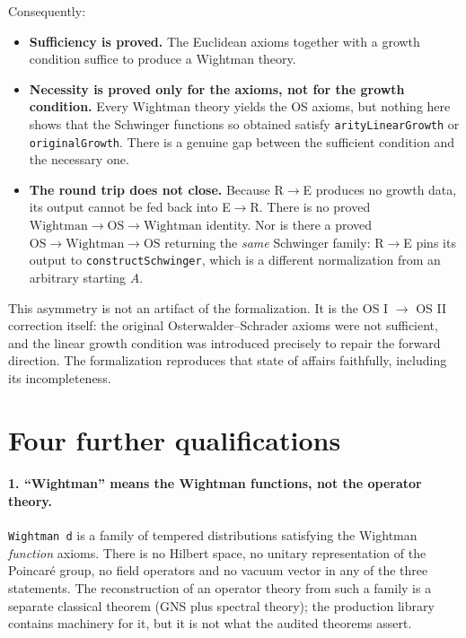 \documentclass[11pt,a4paper]{article}
\newcommand{\lean}[1]{\texttt{#1}}
\begin{document}
Consequently:

\begin{itemize}[leftmargin=1.6em,itemsep=4pt]
\item \textbf{Sufficiency is proved.} The Euclidean axioms together with a growth
condition suffice to produce a Wightman theory.
\item \textbf{Necessity is proved only for the axioms, not for the growth
condition.} Every Wightman theory yields the OS axioms, but nothing here shows
that the Schwinger functions so obtained satisfy \lean{arityLinearGrowth} or
\lean{originalGrowth}. There is a genuine gap between the sufficient condition
and the necessary one.
\item \textbf{The round trip does not close.} Because R$\to$E produces no growth
data, its output cannot be fed back into E$\to$R. There is no proved
$\text{Wightman} \to \text{OS} \to \text{Wightman}$ identity. Nor is there a
proved $\text{OS} \to \text{Wightman} \to \text{OS}$ returning the \emph{same}
Schwinger family: R$\to$E pins its output to \lean{constructSchwinger}, which is
a different normalization from an arbitrary starting $A$.
\end{itemize}

This asymmetry is not an artifact of the formalization. It is the OS I $\to$
OS II correction itself: the original Osterwalder--Schrader axioms were not
sufficient, and the linear growth condition was introduced precisely to repair
the forward direction. The formalization reproduces that state of affairs
faithfully, including its incompleteness.

\section{Four further qualifications}

\paragraph{1. ``Wightman'' means the Wightman functions, not the operator theory.}
\lean{Wightman d} is a family of tempered distributions satisfying the Wightman
\emph{function} axioms. There is no Hilbert space, no unitary representation of
the Poincar\'e group, no field operators and no vacuum vector in any of the three
statements. The reconstruction of an operator theory from such a family is a
separate classical theorem (GNS plus spectral theory); the production library
contains machinery for it, but it is not what the audited theorems assert.
\end{document}
